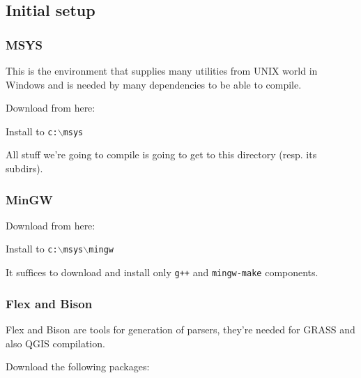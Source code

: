 \subsection{Initial setup}
\subsubsection{MSYS}
This is the environment that supplies many utilities from UNIX world in Windows and is needed
by many dependencies to be able to compile.

Download from here:

	\begin{quotation}
	\end{quotation}

Install to \texttt{c:$\backslash$msys}

All stuff we're going to compile is going to get to this directory (resp. its subdirs).

\subsubsection{MinGW}
Download from here:

	\begin{quotation}
	\end{quotation}

Install to \texttt{c:$\backslash$msys$\backslash$mingw}

It suffices to download and install only \texttt{g++} and \texttt{mingw-make} components.

\subsubsection{Flex and Bison}
Flex and Bison are tools for generation of parsers, they're needed for GRASS and also QGIS compilation.

Download the following packages:

	\begin{quotation}
	\end{quotation}

